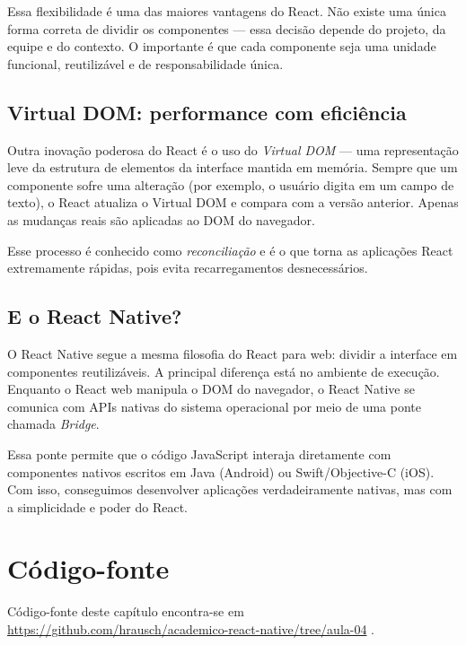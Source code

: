 Essa flexibilidade é uma das maiores vantagens do React. Não existe uma única forma correta de dividir os componentes — essa decisão depende do projeto, da equipe e do contexto. O importante é que cada componente seja uma unidade funcional, reutilizável e de responsabilidade única.

\subsection*{Virtual DOM: performance com eficiência}

Outra inovação poderosa do React é o uso do \textit{Virtual DOM} — uma representação leve da estrutura de elementos da interface mantida em memória. Sempre que um componente sofre uma alteração (por exemplo, o usuário digita em um campo de texto), o React atualiza o Virtual DOM e compara com a versão anterior. Apenas as mudanças reais são aplicadas ao DOM do navegador.

Esse processo é conhecido como \textit{reconciliação} e é o que torna as aplicações React extremamente rápidas, pois evita recarregamentos desnecessários.

\subsection*{E o React Native?}

O React Native segue a mesma filosofia do React para web: dividir a interface em componentes reutilizáveis. A principal diferença está no ambiente de execução. Enquanto o React web manipula o DOM do navegador, o React Native se comunica com APIs nativas do sistema operacional por meio de uma ponte chamada \textit{Bridge}.

Essa ponte permite que o código JavaScript interaja diretamente com componentes nativos escritos em Java (Android) ou Swift/Objective-C (iOS). Com isso, conseguimos desenvolver aplicações verdadeiramente nativas, mas com a simplicidade e poder do React.



\section*{Código-fonte}
Código-fonte deste capítulo encontra-se em \href{https://github.com/hrausch/academico-react-native/tree/aula-04}{https://github.com/hrausch/academico-react-native/tree/aula-04} .


